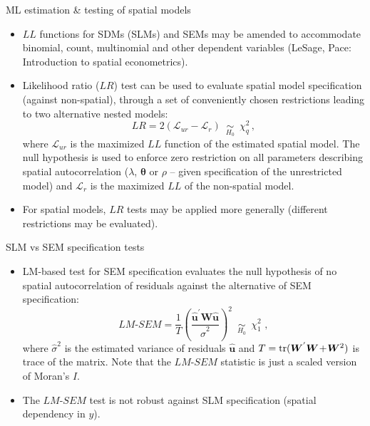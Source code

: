 \documentclass{beamer}
\begin{document}
\begin{frame}{ML estimation \& testing of spatial models}
\small
\begin{itemize}
    \item $LL$ functions  for SDMs (SLMs) and SEMs may be amended to accommodate binomial, count, multinomial and other dependent variables (LeSage, Pace: Introduction  to  spatial  econometrics).
    \smallskip
    \item Likelihood ratio ($LR$) test can be used to evaluate spatial model specification (against non-spatial), through a set of conveniently chosen restrictions leading to two alternative nested models:
\begin{equation*}
\textit{LR} = 2(\mathcal{L}_{ur}-\mathcal{L}_{r}) \,\,\, \underset{H_0}{\sim} \,\,\, \chi_q^2 \, ,
\end{equation*}
where $\mathcal{L}_{ur}$ is the maximized $LL$ function  of the estimated spatial model. The null hypothesis is used to enforce zero restriction on all parameters describing spatial autocorrelation ($\lambda$, $\bm{\theta}$ or $\rho$ -- given specification of the unrestricted model) and $\mathcal{L}_{r}$ is the maximized $LL$ of the non-spatial model.
\smallskip
\item For spatial models, $LR$ tests may be applied more generally (different restrictions may be evaluated).
\end{itemize}
\end{frame}
\begin{frame}{SLM vs SEM specification tests}
\begin{itemize}
    \item LM-based test for SEM specification evaluates the null hypothesis of no spatial autocorrelation of residuals against the alternative of SEM specification: 
\begin{equation*}
\textit{LM-SEM}=\frac{1}{T}
\left(\frac{\bm{\hat{u}}^{'}\bm{W\hat{u}}}{\hat{\sigma}^2}\right)^{2} 
\,\,\, \underset{H_0}{\sim} \,\,\, \chi_1^2 \,\,,
\end{equation*}
where $\hat{\sigma}^2$ is the estimated variance of residuals $\bm{\hat{u}}$ and $T=\textnormal{tr}(\bm{W}^{'}\bm{W} \! + \! \bm{W}^2)$ is trace of the matrix. Note that the $\textit{LM-SEM}$ statistic is just a scaled version of Moran's $I$.
\smallskip
\item The $\textit{LM-SEM}$ test is not robust against SLM specification (spatial dependency in $y$).
\end{itemize}
\end{frame}
\end{document}

